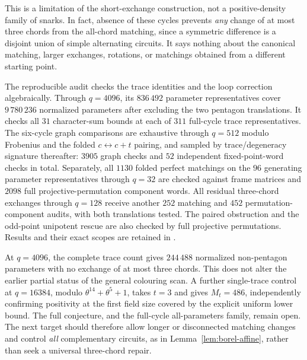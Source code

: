 \documentclass[11pt,a4paper]{article}
\theoremstyle{definition}
\theoremstyle{remark}
\begin{document}
This is a limitation of the short-exchange construction, not a positive-density family of snarks.  In fact, absence of these cycles prevents \emph{any} change of at most three chords from the all-chord matching, since a symmetric difference is a disjoint union of simple alternating circuits.  It says nothing about the canonical matching, larger exchanges, rotations, or matchings obtained from a different starting point.

The reproducible audit  checks the trace identities and the loop correction algebraically.  Through $q=4096$, its $836\,492$ parameter representatives cover $9\,780\,236$ normalized parameters after excluding the two pentagon translations.  It checks all $31$ character-sum bounds at each of $311$ full-cycle trace representatives.  The six-cycle graph comparisons are exhaustive through $q=512$ modulo Frobenius and the folded $c\leftrightarrow c+t$ pairing, and sampled by trace/degeneracy signature thereafter: $3905$ graph checks and $52$ independent fixed-point-word checks in total.  Separately, all $1130$ folded perfect matchings on the $96$ generating parameter representatives through $q=32$ are checked against frame matrices and $2098$ full projective-permutation component words.  All residual three-chord exchanges through $q=128$ receive another $252$ matching and $452$ permutation-component audits, with both translations tested.  The paired obstruction and the odd-point unipotent rescue are also checked by full projective permutations.  Results and their exact scopes are retained in .

At $q=4096$, the complete trace count gives $244\,488$ normalized non-pentagon parameters with no exchange of at most three chords.  This does not alter the earlier partial status of the general colouring scan.  A further single-trace control at $q=16384$, modulo $\theta^{14}+\theta^5+1$, takes $t=3$ and gives $M_t=486$, independently confirming positivity at the first field size covered by the explicit uniform lower bound.  The full conjecture, and the full-cycle all-parameters family, remain open.  The next target should therefore allow longer or disconnected matching changes and control \emph{all} complementary circuits, as in Lemma~\ref{lem:borel-affine}, rather than seek a universal three-chord repair.
\end{document}
